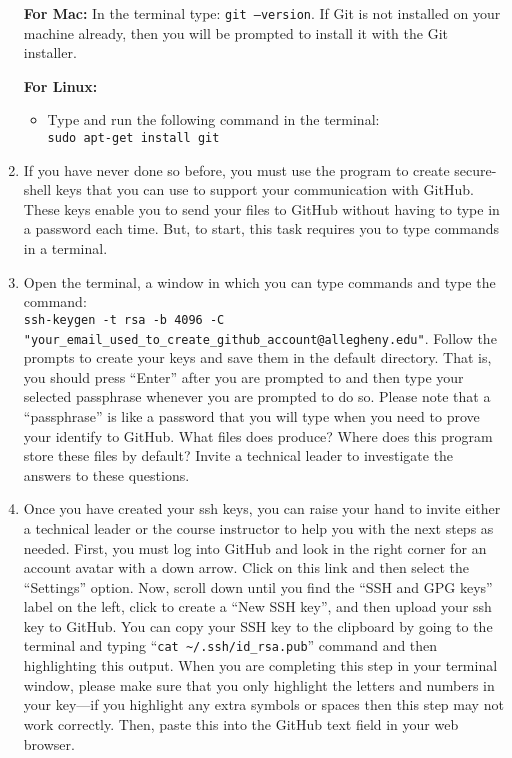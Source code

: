 \begin{enumerate}
  \textbf{For Mac:} In the terminal type: {\tt git --version}. If Git is not installed on your machine already, then you will be prompted to install it with the Git installer.
  
  \textbf{For Linux:} 
  \begin{itemize}
  	\item 
  	Type and run the following command in the terminal: \\
  	{\tt sudo apt-get install git}
  \end{itemize}

  \item If you have never done so before, you must use the  program to create secure-shell keys that
    you can use to support your communication with GitHub. These keys enable you to send your files to GitHub without having to type in a password each time.  But, to start, this task requires you to type commands in a terminal. 

  \item Open the terminal, a window in which you can type commands and type the command: \\
  {\tt ssh-keygen -t rsa -b 4096 -C "your\_email\_used\_to\_create\_github\_account@allegheny.edu"}. Follow
    the prompts to create your keys and save them in the default directory. That is, you should press ``Enter'' after
    you are prompted to  and then type your selected passphrase
    whenever you are prompted to do so. Please note that a ``passphrase'' is like a password that you will type when you
    need to prove your identify to GitHub. What files does  produce? Where does this program store
    these files by default? Invite a technical leader to investigate the answers to these questions.

  \item Once you have created your ssh keys, you can raise your hand to invite either a technical leader or the
    course instructor to help you with the next steps as needed. First, you must log into GitHub and look in the right corner for
    an account avatar with a down arrow. Click on this link  and then select the ``Settings'' option. Now, scroll down until you find the ``SSH and GPG keys'' label on the left, click to create a ``New SSH key'', and then upload your
    ssh key to GitHub. You can copy your SSH key to the clipboard by going to the terminal and typing ``{\tt cat
    \textasciitilde{}/.ssh/id\_rsa.pub}'' command and then highlighting this output. When you are completing this step
    in your terminal window, please make sure that you only highlight the letters and numbers in your key---if you
    highlight any extra symbols or spaces then this step may not work correctly. Then, paste this into the GitHub text
    field in your web browser.


\end{enumerate}
